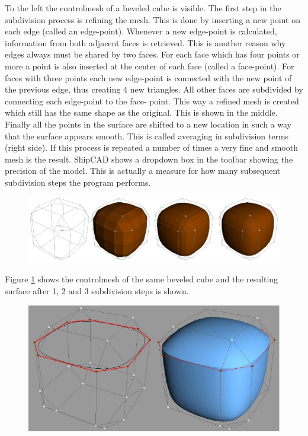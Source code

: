 \documentclass[12pt]{article}
\begin{document}
To the left the controlmesh of a beveled cube is visible. The first
step in the subdivision process is refining the mesh. This is done by
inserting a new point on each edge (called an edge-point).  Whenever a
new edge-point is calculated, information from both adjacent faces is
retrieved. This is another reason why edges always must be shared by
two faces. For each face which has four points or more a point is also
inserted at the center of each face (called a face-point). For faces
with three points each new edge-point is connected with the new point
of the previous edge, thus creating 4 new triangles. All other faces
are subdivided by connecting each edge-point to the face- point. This
way a refined mesh is created which still has the same shape as the
original. This is shown in the middle. Finally all the points in the
surface are shifted to a new location in such a way that the surface
appears smooth. This is called averaging in subdivision terms (right
side). If this process is repeated a number of times a very fine and
smooth mesh is the result. ShipCAD shows a dropdown box in the toolbar
showing the precision of the model. This is actually a measure for how
many subsequent subdivision steps the program performs.

\begin{figure}[h]
        \centering
        \includegraphics[width=12cm,natwidth=1065,natheight=280]{figure5.png}
        \caption{}
        \label{fig:mesh4}
\end{figure}

Figure \ref{fig:mesh4} shows the controlmesh of the same beveled cube
and the resulting surface after 1, 2 and 3 subdivision steps is shown.

\begin{figure}[h]
        \centering
        \includegraphics[width=15cm,natwidth=535,natheight=268]{figure6.png}
        \caption{}
        \label{fig:mesh5}
\end{figure}
\end{document}
